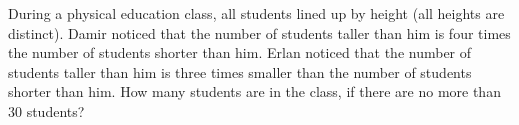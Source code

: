 During a physical education class, all students lined up by height (all heights are distinct). Damir noticed that the number of students taller than him is four times the number of students shorter than him. Erlan noticed that the number of students taller than him is three times smaller than the number of students shorter than him. How many students are in the class, if there are no more than $30$ students?
